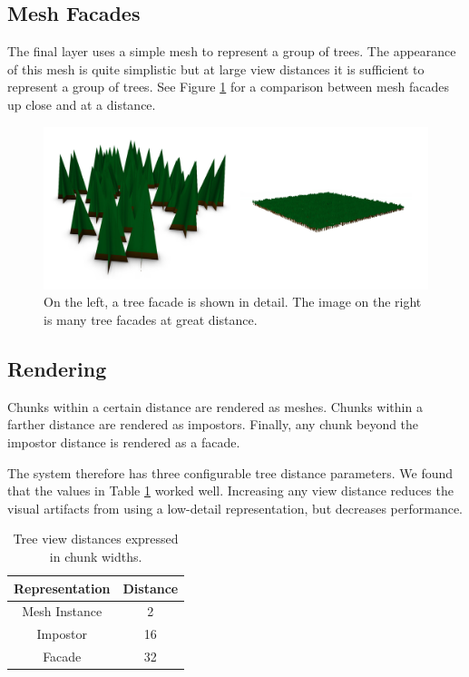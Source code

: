 \subsection{Mesh Facades}

The final layer uses a simple mesh to represent a group of trees.
The appearance of this mesh is quite simplistic but at large view distances it is sufficient to represent a group of trees.
See Figure \ref{fig:tree_facades} for a comparison between mesh facades up close and at a distance.

\begin{figure}
	\centering
		\includegraphics[width=1.0\textwidth]{figures/tree_facades.jpg}
	\caption{
		On the left, a tree facade is shown in detail.
		The image on the right is many tree facades at great distance.
	}
	\label{fig:tree_facades}
\end{figure}

\subsection{Rendering}

Chunks within a certain distance are rendered as meshes.
Chunks within a farther distance are rendered as impostors.
Finally, any chunk beyond the impostor distance is rendered as a facade.

The system therefore has three configurable tree distance parameters.
We found that the values in Table \ref{tab:tree_distance} worked well.
Increasing any view distance reduces the visual artifacts from using a low-detail representation, but decreases performance.

\begin{table}
	\centering
	\begin{tabular}{ || c | c || }
		\hline
		Representation & Distance \\ [0.5ex]
		\hline\hline
		Mesh Instance & 2 \\
		\hline
		Impostor & 16 \\
		\hline
		Facade & 32 \\
		\hline
	\end{tabular}
	\caption{Tree view distances expressed in chunk widths.}
	\label{tab:tree_distance}
\end{table}

